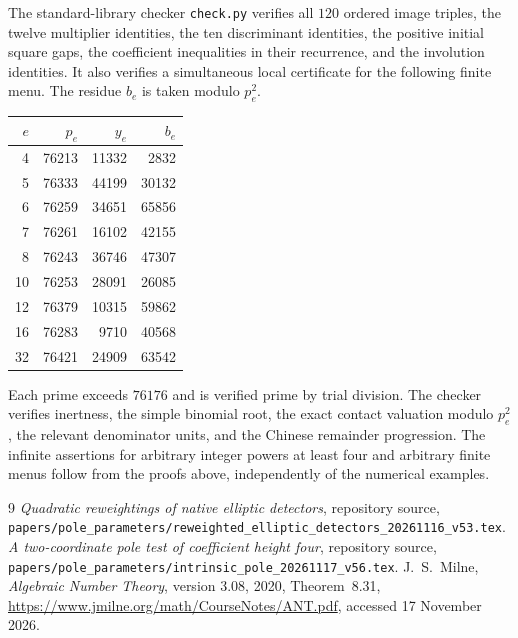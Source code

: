 \documentclass[11pt,a4paper]{article}
\begin{document}
The standard-library checker \texttt{check.py} verifies all $120$
ordered image triples, the twelve multiplier identities, the ten
discriminant identities, the positive initial square gaps, the
coefficient inequalities in their recurrence, and the involution
identities. It also verifies a simultaneous local certificate for
the following finite menu. The residue $b_e$ is taken modulo $p_e^2$.
\begin{center}
\begin{tabular}{rrrr}\toprule
$e$&$p_e$&$y_e$&$b_e$\\\midrule
4&76213&11332&2832\\
5&76333&44199&30132\\
6&76259&34651&65856\\
7&76261&16102&42155\\
8&76243&36746&47307\\
10&76253&28091&26085\\
12&76379&10315&59862\\
16&76283&9710&40568\\
32&76421&24909&63542\\\bottomrule
\end{tabular}
\end{center}
Each prime exceeds $76176$ and is verified prime by trial division.
The checker verifies inertness, the simple binomial root, the exact
contact valuation modulo $p_e^2$, the relevant denominator units,
and the Chinese remainder progression. The infinite assertions for
arbitrary integer powers at least four and arbitrary finite menus follow from the
proofs above, independently of the numerical examples.

\begin{thebibliography}{9}
\emph{Quadratic reweightings of native elliptic detectors}, repository source,
\nolinkurl{papers/pole_parameters/reweighted_elliptic_detectors_20261116_v53.tex}.
\emph{A two-coordinate pole test of coefficient height four}, repository source,
\nolinkurl{papers/pole_parameters/intrinsic_pole_20261117_v56.tex}.
J.~S.~Milne, \emph{Algebraic Number Theory}, version 3.08, 2020,
Theorem~8.31, \url{https://www.jmilne.org/math/CourseNotes/ANT.pdf},
accessed 17 November 2026.
\end{thebibliography}
\end{document}

